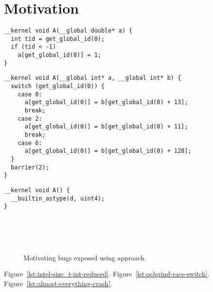 \section{Motivation}

\newsavebox{\IntelSizetIntReduced}
\begin{lrbox}{\IntelSizetIntReduced}
\begin{lstlisting}
__kernel void A(__global double* a) {
  int tid = get_global_id(0);
  if (tid < -1)
    a[get_global_id(0)] = 1;
}
\end{lstlisting}
\end{lrbox}

\newsavebox{\OclgrindRaceSwitch}
\begin{lrbox}{\OclgrindRaceSwitch}
\begin{lstlisting}
__kernel void A(__global int* a, __global int* b) {
  switch (get_global_id(0)) {
    case 0:
      a[get_global_id(0)] = b[get_global_id(0) + 13];
      break;
    case 2:
      a[get_global_id(0)] = b[get_global_id(0) + 11];
      break;
    case 6:
      a[get_global_id(0)] = b[get_global_id(0) + 128];
  }
  barrier(2);
}
\end{lstlisting}
\end{lrbox}

\newsavebox{\AlmostEverythingCrash}
\begin{lrbox}{\AlmostEverythingCrash}
\begin{lstlisting}
__kernel void A() {
  __builtin_astype(d, uint4);
}
\end{lstlisting}
\end{lrbox}


\begin{figure}
  \centering %
  \\%
  \\%
  \\%
  \caption{Motivating bugs exposed using approach.}%
  \label{lst:motivation}%
\end{figure}


Figure~\ref{lst:intel-size_t-int-reduced}.
Figure~\ref{lst:oclgrind-race-switch}.
Figure~\ref{lst:almost-everything-crash}.
